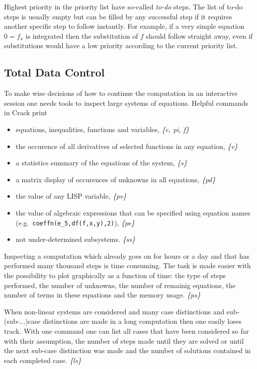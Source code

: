 \documentclass[12pt]{article}
\begin{document}
  Highest priority in the priority list have so-called {\em to-do}
  steps. The list of to-do steps is usually empty but can be filled by
  any successful step if it requires another specific step to follow
  instantly. For example, if a very simple equation $0=f_x$ is
  integrated then the substitution of $f$ should follow straight away, even
  if substitutions would have a low priority according to the
  current priority list.

\subsection{Total Data Control}
  To make wise decisions of how to continue
  the computation in an interactive session one needs tools to inspect large systems of
  equations.
  Helpful commands in {\sc Crack} print
  \begin{itemize}
  \item equations, inequalities, functions and variables, {\em \{e, pi, f\} }
  \item the occurence of all derivatives of selected functions in any
    equation, {\em \{v\} }
  \item a statistics summary of the equations of the system, {\em \{s\} }
  \item a matrix display of occurences of unknowns in all equations, {\em \{pd\} }
  \item the value of any LISP variable, {\em \{pv\} }
  \item the value of algebraic expressions that can be specified using
        equation names \\
        (e.g.\ {\tt coeffn(e\_5,df(f,x,y),2)}), {\em \{pe\} }
  \item not under-determined subsystems. {\em \{ss\} }
  \end{itemize}

  Inspecting a computation which already goes on for hours or a day and
  that has performed many thousand steps is time consuming. The task is made
  easier with the possibility to plot graphically as a function of
  time: the type of steps performed, the number of unknowns,
  the number of remainig equations, the number of terms in these
  equations and the memory usage. {\em \{ps\} }

  When non-linear systems are considered and many case distinctions
  and sub-(sub-...)case distinctions are made in a long computation
  then one easily loses track. With one command one can
  list all cases that have been considered so far with their assumption, the number
  of steps made until they are solved or until the next sub-case distinction
  was made and the number of solutions contained in each completed
  case. {\em \{ls\} }
\end{document}
